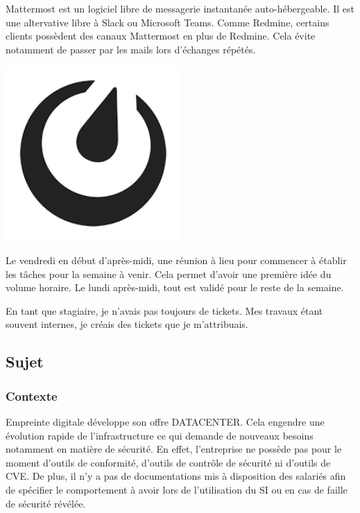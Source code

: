 \documentclass[12pt]{article}
\begin{document}
\noindent%
\begin{minipage}{.7\textwidth}%
Mattermost est un logiciel libre de messagerie instantanée auto-hébergeable.
Il est une altervative libre à \gls{Slack} ou \gls{Microsoft Teams}.
Comme \gls{Redmine}, certains clients possèdent des canaux Mattermost en plus de \gls{Redmine}.
Cela évite notamment de passer par les mails lors d'échanges répétés. \\
\end{minipage}%
\hfill
\begin{minipage}{.3\textwidth}%
\begin{center}
\includegraphics[width=0.5\textwidth]{src/logo_mattermost.png}
\end{center}
\end{minipage}%

Le vendredi en début d'après-midi, une réunion à lieu pour commencer à établir les tâches pour la semaine à venir.
Cela permet d'avoir une première idée du volume horaire.
Le lundi après-midi, tout est validé pour le reste de la semaine.

En tant que stagiaire, je n'avais pas toujours de tickets.
Mes travaux étant souvent internes, je créais des tickets que je m'attribuais.

\newpage
\subsection{Sujet}
\subsubsection{Contexte}
Empreinte digitale développe son offre DATACENTER. 
Cela engendre une évolution rapide de l'infrastructure ce qui demande de nouveaux besoins notamment en matière de sécurité. 
En effet, l'entreprise ne possède pas pour le moment d'outils de conformité, d'outils de contrôle de sécurité ni d'outils de \gls{CVE}. 
De plus, il n'y a pas de documentations mis à disposition des salariés afin de spécifier le comportement à avoir lors de l'utilisation du \gls{SI} ou en cas de faille de sécurité révélée.
\end{document}
